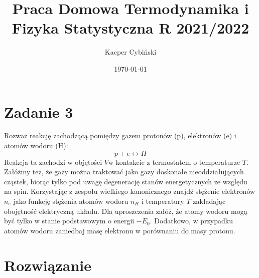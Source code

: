 \documentclass[12pt,a4paper]{article}
\title{Praca Domowa Termodynamika i Fizyka Statystyczna R 2021/2022}
\author{Kacper Cybiński}
\date{\today}
\begin{document}
\maketitle

\section{Zadanie 3}

Rozważ reakcję zachodzącą pomiędzy gazem protonów (p), elektronów (e) i atomów wodoru (H):
$$
p+e \longleftrightarrow H
$$
Reakcja ta zachodzi w objętości $V \mathrm{w}$ kontakcie z termostatem o temperaturze $T$. Załóżmy też, że gazy można traktować jako gazy doskonałe nieoddziałujących cząstek, biorąc tylko pod uwagę degenerację stanów energetycznych ze względu na spin. Korzystając z zespołu wielkiego kanonicznego znajdź stężenie elektronów $n_{e}$ jako funkcję stężenia atomów wodoru $n_{H}$ i temperatury $T$ zakładając obojętność elektryczną układu. Dla uproszczenia załóż, że atomy wodoru mogą być tylko w stanie podstawowym o energii $-E_{0}$. Dodatkowo, w przypadku atomów wodoru zaniedbaj masę elektronu w porównaniu do masy protonu.

\section{Rozwiązanie}
\end{document}
